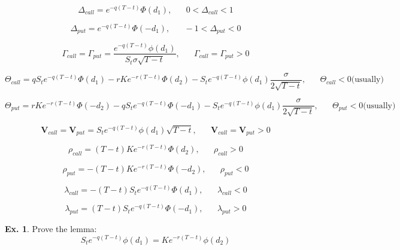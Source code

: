 \documentclass[11pt,a4paper]{book}
\theoremstyle{definition}\newtheorem{definition}{Definition}
\theoremstyle{definition}\newtheorem{fact}{Fact}
\theoremstyle{definition}\newtheorem{remark}{Remark}
\theoremstyle{definition}\newtheorem{ex}{Ex.}
\theoremstyle{definition}\newtheorem{project}{Project}
\theoremstyle{definition}\newtheorem{problem}{Problem}
\theoremstyle{definition}\newtheorem{example}{Example}
\numberwithin{theorem}{section}
\numberwithin{corollary}{chapter}
\numberwithin{assumption}{chapter}
\numberwithin{definition}{chapter}
\numberwithin{prop}{chapter}
\numberwithin{notation}{chapter}
\numberwithin{problem}{chapter}
\numberwithin{example}{chapter}
\numberwithin{fact}{chapter}
\numberwithin{ex}{chapter}
\def\V{\mathbf V}
\begin{document}
$$\Delta_{call} = e^{-q(T-t)}\Phi(d_1), \,\,\,\,\,\,\,\,\,\, 0 < \Delta_{call} < 1 $$

$$\Delta_{put} = e^{-q(T-t)}\Phi(-d_1), \,\,\,\,\,\,\,\,\,\, -1 < \Delta_{put} < 0 $$

$$\Gamma_{call} =  \Gamma_{put} = \frac{e^{-q(T-t)}\phi(d_1)}{S_t \sigma \sqrt{T-t}}, \,\,\,\,\,\,\,\,\,\, \Gamma_{call} = \Gamma_{put} > 0 $$

$$\Theta_{call} = qS_te^{-q(T-t)}\Phi(d_1) - rKe^{-r(T-t)}\Phi(d_2) - S_t e^{-q(T-t)}\phi(d_1)\frac{\sigma}{2\sqrt{T-t}}, \,\,\,\,\,\,\,\,\,\, \Theta_{call} < 0 \text{(usually)} $$

$$\Theta_{put} = rKe^{-r(T-t)}\Phi(-d_2)- qS_te^{-q(T-t)}\Phi(-d_1) - S_t e^{-q(T-t)}\phi(d_1)\frac{\sigma}{2\sqrt{T-t}}, \,\,\,\,\,\,\,\,\,\, \Theta_{put} < 0 \text{(usually)} $$

$$\V_{call} =  \V_{put} = S_t e^{-q(T-t)}\phi(d_1)\sqrt{T-t}, \,\,\,\,\,\,\,\,\,\, \V_{call} = \V_{put} > 0 $$

$$\rho_{call} = (T-t)Ke^{-r(T-t)}\Phi(d_2), \,\,\,\,\,\,\,\,\,\, \rho_{call} > 0 $$

$$\rho_{put} = -(T-t)Ke^{-r(T-t)}\Phi(-d_2), \,\,\,\,\,\,\,\,\,\, \rho_{put} < 0 $$

$$\lambda_{call} = -(T-t)S_te^{-q(T-t)}\Phi(d_1), \,\,\,\,\,\,\,\,\,\, \lambda_{call} < 0 $$

$$\lambda_{put} = (T-t)S_te^{-q(T-t)}\Phi(-d_1), \,\,\,\,\,\,\,\,\,\, \lambda_{put} > 0 $$

\begin{ex}
Prove the lemma:
$$ S_t e^{-q(T-t)}\phi(d_1) = Ke^{-r(T-t)}\phi(d_2) $$
\end{ex}

	
	
	
	
\end{document}
